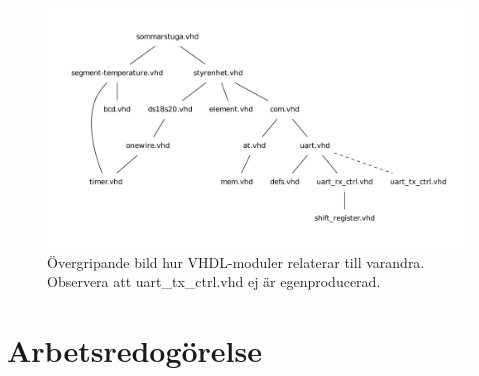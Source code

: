 \documentclass[a4paper]{scrartcl}
\begin{document}
\begin{figure}[htp]
\centering
\includegraphics[width=\textwidth]{filstruktur.pdf}
\caption{Övergripande bild hur VHDL-moduler relaterar till varandra. Observera att uart\_tx\_ctrl.vhd ej är egenproducerad.}
\end{figure}




\clearpage
\section{Arbetsredogörelse}
\end{document}
